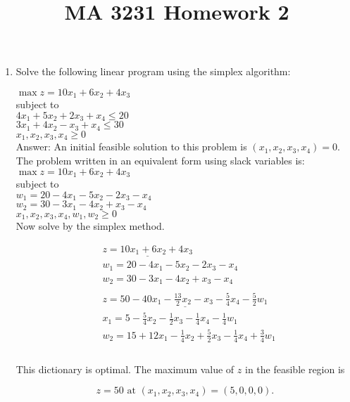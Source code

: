\documentclass{article}
\title{MA 3231 Homework 2}
\date{}
\author{}
\begin{document}
\maketitle

\begin{enumerate}

\item

Solve the following linear program using the simplex algorithm:

$\max z = 10x_1 + 6x_2 + 4x_3$\\
subject to \\
$4x_1 + 5x_2 + 2x_3 + x_4 \leq 20$\\
$3x_1 + 4x_2 - x_3 + x_4 \leq 30$ \\
$x_1, x_2, x_3, x_4 \geq 0$\\

Answer: An initial feasible solution to this problem is $(x_1,x_2,x_3,x_4) = 0$. The problem written in an equivalent form using slack variables is:\\

$\max z = 10x_1 + 6x_2 + 4x_3$\\
subject to \\
$w_1 = 20 - 4x_1 - 5x_2 - 2x_3 - x_4$\\
$w_2 = 30 - 3x_1 - 4x_2 + x_3 - x_4$ \\
$x_1, x_2, x_3, x_4, w_1, w_2 \geq 0$\\

Now solve by the simplex method.

\begin{align*}
&\underline{z = 10x_1 + 6x_2 + 4x_3} \\
&w_1 = 20 - 4x_1 - 5x_2 - 2x_3 - x_4 \\
&w_2 = 30 - 3x_1 - 4x_2 + x_3 - x_4\\
&\\
&\underline{z = 50 - 40x_1 - \frac{13}{2}x_2 - x_3 - \frac{5}{4}x_4 - \frac{5}{2}w_1} \\
&x_1 = 5 - \frac{5}{4}x_2 - \frac{1}{2}x_3 -\frac{1}{4} x_4 - \frac{1}{4}w_1 \\
&w_2 = 15 + 12x_1 -\frac{1}{4}x_2 + \frac{5}{2}x_3- \frac{1}{4}x_4 + \frac{3}{4}w_1\\
&\\
\end{align*}

This dictionary is optimal. The maximum value of $z$ in the feasible region is 

$$
\boxed{ z = 50 \text{ at }
(x_1, x_2, x_3, x_4) =  (5,0,0,0).}
$$


\end{enumerate}
\end{document}
